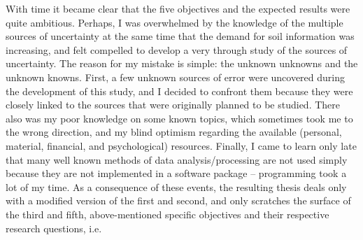With time it became clear that the five objectives and the expected results were quite ambitious.
Perhaps, I was overwhelmed by the knowledge of the multiple sources of uncertainty at the same time
that the demand for soil information was increasing, and felt compelled to develop a very through
study of the sources of uncertainty. The reason for my mistake is simple: the unknown unknowns and
the unknown knowns. First, a few unknown sources of error were uncovered during the development of
this study, and I decided to confront them because they were closely linked to the sources that were
originally planned to be studied. There also was my poor knowledge on some known topics, which
sometimes took me to the wrong direction, and my blind optimism regarding the available (personal,
material, financial, and psychological) resources. Finally, I came to learn only late that many
well known methods of data analysis/processing are not used simply because they are not implemented
in a software package -- programming took a lot of my time. As a consequence of these events, the
resulting thesis deals only with a modified version of the first and second, and only scratches
the surface of the third and fifth, above-mentioned specific objectives and their respective
research questions, i.e.

